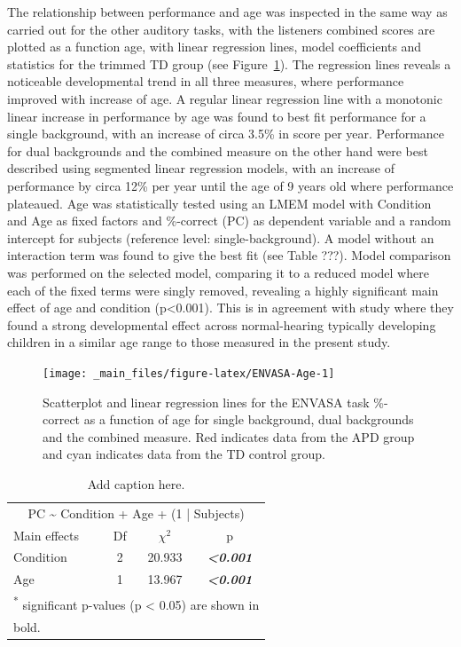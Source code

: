 \documentclass[a4paper, twoside]{templates/ociamthesis}
\begin{document}
The relationship between performance and age was inspected in the same way as carried out for the other auditory tasks, with the listeners combined scores are plotted as a function age, with linear regression lines, model coefficients and statistics for the trimmed TD group (see Figure~\ref{fig:ENVASA-Age}). The regression lines reveals a noticeable developmental trend in all three measures, where performance improved with increase of age. A regular linear regression line with a monotonic linear increase in performance by age was found to best fit performance for a single background, with an increase of circa 3.5\% in score per year. Performance for dual backgrounds and the combined measure on the other hand were best described using segmented linear regression models, with an increase of performance by circa 12\% per year until the age of 9 years old where performance plateaued. Age was statistically tested using an LMEM model with Condition and Age as fixed factors and \%-correct (PC) as dependent variable and a random intercept for subjects (reference level: single-background). A model without an interaction term was found to give the best fit (see Table ???). Model comparison was performed on the selected model, comparing it to a reduced model where each of the fixed terms were singly removed, revealing a highly significant main effect of age and condition (p\textless0.001). This is in agreement with \textcite{Krishnan2013} study where they found a strong developmental effect across normal-hearing typically developing children in a similar age range to those measured in the present study.

\begin{figure}

{\centering \texttt{[image: \_main\_files/figure-latex/ENVASA-Age-1]} 

}

\caption{Scatterplot and linear regression lines for the ENVASA task \%-correct as a function of age for single background, dual backgrounds and the combined measure. Red indicates data from the APD group and cyan indicates data from the TD control group.}\label{fig:ENVASA-Age}
\end{figure}

\begin{table}

\caption{\label{tab:ENVASA-AgeLMEMTab}Add caption here.}
\centering
\begin{tabular}[t]{lcc>{}c}
\toprule
\multicolumn{4}{c}{PC \textasciitilde{} Condition + Age + (1 | Subjects)} \\
\cmidrule(l{3pt}r{3pt}){1-4}
Main effects & Df & $\chi^{2}$ & p\\
\midrule
Condition & 2 & 20.933 & \em{\textbf{<0.001}}\\
Age & 1 & 13.967 & \em{\textbf{<0.001}}\\
\bottomrule
\multicolumn{4}{l}{\textsuperscript{*} significant p-values (p < 0.05) are shown in}\\
\multicolumn{4}{l}{bold.}\\
\end{tabular}
\end{table}
\end{document}
